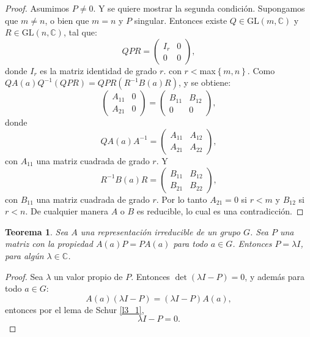 \documentclass[12pt]{book}
\newtheorem{theorem}{Teorema}[section]
\theoremstyle{definition}
\newcounter{in}
\begin{document}
\begin{proof}
  Asumimos $P \neq 0$. Y se quiere mostrar la segunda
  condición. Supongamos que $m \neq n$, o bien que $m=n$ y $P$ singular. Entonces existe $Q \in \mathrm{GL}(m,\mathbb{C})$ y
  $R \in \mathrm{GL}(n,\mathbb{C})$, tal que:
  \begin{equation}
    \label{eq:16}
    QPR=
    \begin{pmatrix}
      I_{r} & 0 \\ 
      0 & 0
    \end{pmatrix}, 
  \end{equation}
  donde $I_{r}$ es la matriz identidad de grado $r$. con
  $r<$max$\left\{ m,n \right\}$. Como
  $QA(a)Q^{-1}(QPR) = QPR(R^{-1}B(a)R)$, y se obtiene:
  \begin{equation}
    \label{eq:17}
    \begin{pmatrix}
      A_{11} & 0 \\ 
      A_{21} & 0
    \end{pmatrix}
    =
    \begin{pmatrix}
      B_{11} & B_{12} \\ 
      0 & 0
    \end{pmatrix},
  \end{equation}
  donde
  \begin{equation}
    \label{eq:18}
    QA(a)A^{-1}=
    \begin{pmatrix}
      A_{11} & A_{12} \\ 
      A_{21} & A_{22}
    \end{pmatrix}, 
  \end{equation}  
  con $A_{11}$ una matriz cuadrada de grado $r$. Y
  \begin{equation}
    \label{eq:19}
    R^{-1}B(a)R=
    \begin{pmatrix}
      B_{11} & B_{12} \\ 
      B_{21} & B_{22}
    \end{pmatrix},
  \end{equation}
  con $B_{11}$ una matriz cuadrada de grado $r$. Por lo tanto
  $A_{21}=0$ si $r<m$ y $B_{12}$ si $r<n$. De cualquier manera
  $A$ o $B$ es reducible, lo cual es una
  contradicción.
\end{proof}

\begin{theorem}
  \label{t3_2}
  Sea $A$ una representación irreducible de un grupo $G$. Sea $P$ una
  matriz con la propiedad $A(a)P=PA(a)$ para todo $a \in G$. Entonces
  $P=\lambda I$, para algún $\lambda \in \mathbb{C}$.
\end{theorem}
\begin{proof}
  Sea $\lambda$ un valor propio de $P$. Entonces
  $\det(\lambda I - P)=0$, y además para todo $a \in G$:
  \begin{equation}
    \label{eq:20}
    A(a)(\lambda I - P)=(\lambda I - P)A(a),
  \end{equation}
  entonces por el lema de Schur \ref{l3_1},
  \begin{equation}
    \label{eq:21}
    \lambda I-P=0.
  \end{equation}
\end{proof}
\end{document}
